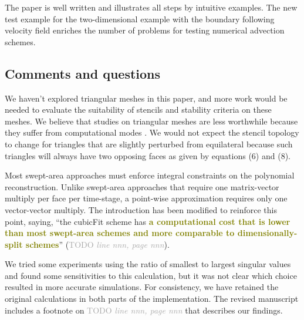 \documentclass[times]{elsarticle}
\newcommand{\TODO}[1]{\textcolor{darkgray}{TODO \textit{#1}}}
\newcommand{\revthree}[1]{\textcolor{olive}{\textbf{#1}}}
\begin{document}
The paper is well written and illustrates all steps by intuitive examples. The new test example
for the two-dimensional example with the boundary following velocity field enriches the number of
problems for testing numerical advection schemes.

\subsection*{Comments and questions}

\begin{quotation}
\begin{comment}
\setcounter{commenti}{0}
\item Can you comment on the stencil for triangular grids. In case of a slightly perturbed triangular grid
with  equilateral triangles the stencil changes in comparison the unperturbed case.
\end{comment}
\end{quotation}
We haven't explored triangular meshes in this paper, and more work would be needed to evaluate the suitability of stencils and stability criteria on these meshes.
We believe that studies on triangular meshes are less worthwhile because they suffer from computational modes \citep{weller2012}.
We would not expect the stencil topology to change for triangles that are slightly perturbed from equilateral because such triangles will always have two opposing faces as given by equations (6) and (8).

\begin{quotation}
\begin{comment}
\item Why do you prefer the point wise approximation?
\end{comment}
\end{quotation}
Most swept-area approaches must enforce integral constraints on the polynomial reconstruction.  Unlike swept-area approaches that require one matrix-vector multiply per face per time-stage, a point-wise approximation requires only one vector-vector multiply.
The introduction has been modified to reinforce this point, saying, ``the cubicFit scheme has \revthree{a computational cost that is lower than most swept-area schemes and more comparable to dimensionally-split schemes}'' (\TODO{line nnn, page nnn}).

\begin{quotation}
\begin{comment}
\item The singular value test should be relative to the largest singular value.
\end{comment}
\end{quotation}
We tried some experiments using the ratio of smallest to largest singular values and found some sensitivities to this calculation, but it was not clear which choice resulted in more accurate simulations.
For consistency, we have retained the original calculations in both parts of the implementation.  The revised manuscript includes a footnote on \TODO{line nnn, page nnn} that describes our findings.
\end{document}
